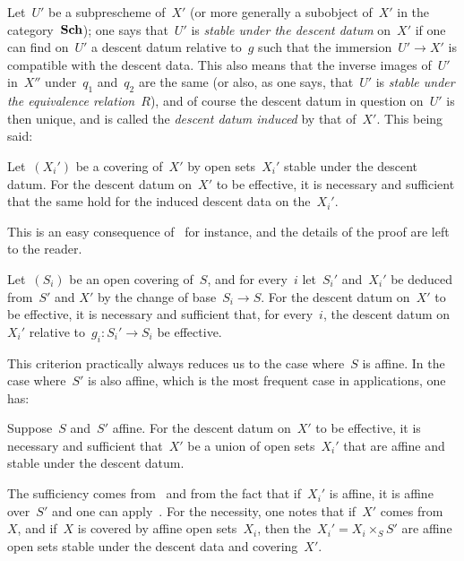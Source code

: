 Let~$U'$ be a subprescheme of~$X'$ (or more
generally a subobject of~$X'$ in the
category~$\mathbf{Sch}$); one says that~$U'$ is \emph{stable under the
descent datum} on~$X'$ if one can find on~$U'$ a
descent datum relative to~$g$ such that
the immersion~$U'\to X'$ is compatible with the descent
data. This also means that the inverse images of~$U'$
in~$X''$ under~$q_{1}$ and~$q_{2}$ are the same (or also, as
one says, that~$U'$ is \emph{stable under the equivalence
relation}~$R$), and of course the descent datum in
question on~$U'$ is then unique, and is called the \emph{descent
datum induced}
by that of~$X'$. This being said:

\begin{proposition}
\label{VIII.7.2}
Let~$(X_{i}')$ be a covering of~$X'$ by open sets~$X_{i}'$
stable
under the descent datum. For the descent datum
on~$X'$ to be effective, it is necessary and sufficient that the
same hold for the induced descent data on the~$X_{i}'$.
\end{proposition}

This is an easy consequence of~ for instance,
and the details of the proof are left to the reader.

\begin{corollary}
\label{VIII.7.3}
Let~$(S_{i})$ be an open covering of~$S$, and for every~$i$
let~$S_{i}'$ and~$X_{i}'$ be deduced from~$S'$
and
$X'$ by the change of base~$S_{i}\to S$. For the descent
datum on~$X'$ to be effective, it is necessary and sufficient that, for
every~$i$, the descent datum on~$X_{i}'$ relative
to~$g_{i}\colon S_{i}'\to S_{i}$ be effective.
\end{corollary}

This criterion practically always reduces us to the case where~$S$
is affine. In the case where~$S'$ is also affine, which
is the most frequent case in applications, one has:

\begin{corollary}
\label{VIII.7.4}
Suppose~$S$ and~$S'$ affine. For the descent datum
on~$X'$ to be effective, it is necessary and sufficient that~$X'$ be
a union of open sets~$X_{i}'$ that are affine and stable under the
descent datum.
\end{corollary}

The sufficiency comes from~ and from the fact that if~$X_{i}'$
is affine, it is affine over~$S'$ and one can
apply~. For the necessity, one notes that
if~$X'$ comes from~$X$, and if~$X$ is covered by affine open
sets~$X_{i}$, then the~$X_{i}'=X_{i}\times_{S}S'$ are affine open
sets stable under the descent data and covering~$X'$.

